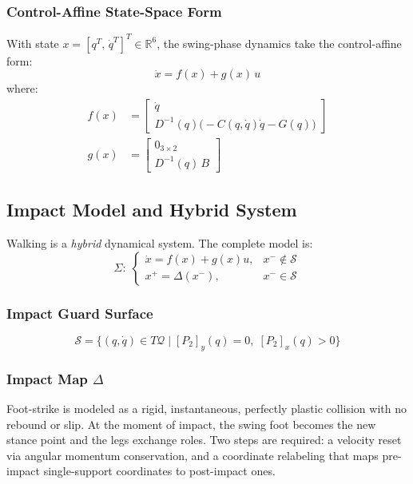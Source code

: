 \documentclass[conference]{IEEEtran}
\begin{document}
\subsubsection{Control-Affine State-Space Form}
With state $x = [q^T,\, \dot{q}^T]^T \in \mathbb{R}^6$, the swing-phase dynamics take the control-affine form:
\begin{equation}
    \dot{x} = f(x) + g(x)\,u \label{eq:affine}
\end{equation}
where:
\begin{align}
    f(x) &= \begin{bmatrix} \dot{q} \\ D^{-1}(q)\bigl(-C(q,\dot{q})\dot{q} - G(q)\bigr) \end{bmatrix} \\
    g(x) &= \begin{bmatrix} 0_{3\times 2} \\ D^{-1}(q)\,B \end{bmatrix}
\end{align}

\subsection{Impact Model and Hybrid System}

Walking is a \emph{hybrid} dynamical system. The complete model is:
\begin{equation}
    \Sigma:\; \begin{cases} \dot{x} = f(x) + g(x)u, & x^- \notin \mathcal{S} \\ x^+ = \Delta(x^-), & x^- \in \mathcal{S} \end{cases}
\end{equation}

\subsubsection{Impact Guard Surface}
\begin{equation}
    \mathcal{S} = \bigl\{(q,\dot{q})\in T\mathcal{Q} \;\big|\; [P_2]_y(q) = 0,\; [P_2]_x(q) > 0\bigr\}
\end{equation}

\subsubsection{Impact Map $\Delta$}

Foot-strike is modeled as a rigid, instantaneous, perfectly plastic collision with no rebound or slip. At the moment of impact, the swing foot becomes the new stance point and the legs exchange roles. Two steps are required: a velocity reset via angular momentum conservation, and a coordinate relabeling that maps pre-impact single-support coordinates to post-impact ones.
\end{document}
